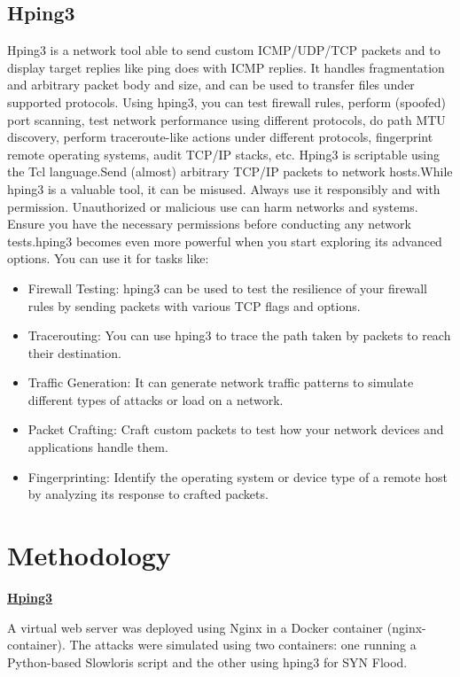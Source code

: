 \documentclass[conference]{IEEEtran}
\begin{document}
\subsection{Hping3}
Hping3 is a network tool able to send custom ICMP/UDP/TCP packets and to display target replies like ping does with ICMP replies. It handles fragmentation and arbitrary packet body and size, and can be used to transfer files under supported protocols. Using hping3, you can test firewall rules, perform (spoofed) port scanning, test network performance using different protocols, do path MTU discovery, perform traceroute-like actions under different protocols, fingerprint remote operating systems, audit TCP/IP stacks, etc. Hping3 is scriptable using the Tcl language.Send (almost) arbitrary TCP/IP packets to network hosts.While hping3 is a valuable tool, it can be misused. Always use it responsibly and with permission. Unauthorized or malicious use can harm networks and systems. Ensure you have the necessary permissions before conducting any network tests.hping3 becomes even more powerful when you start exploring its advanced options. You can use it for tasks like:
\begin{itemize}
\item Firewall Testing: hping3 can be used to test the resilience of your firewall rules by sending packets with various TCP flags and options.
 \item Tracerouting: You can use hping3 to trace the path taken by packets to reach their destination.
\item Traffic Generation: It can generate network traffic patterns to simulate different types of attacks or load on a network.
 \item Packet Crafting: Craft custom packets to test how your network devices and applications handle them.
\item Fingerprinting: Identify the operating system or device type of a remote host by analyzing its response to crafted packets.
\end{itemize}




\section{Methodology}
\underline{\textbf{Hping3}}

A virtual web server was deployed using Nginx in a Docker container (nginx-container). The attacks were simulated using two containers: one running a Python-based Slowloris script and the other using hping3 for SYN Flood.\\
\end{document}
